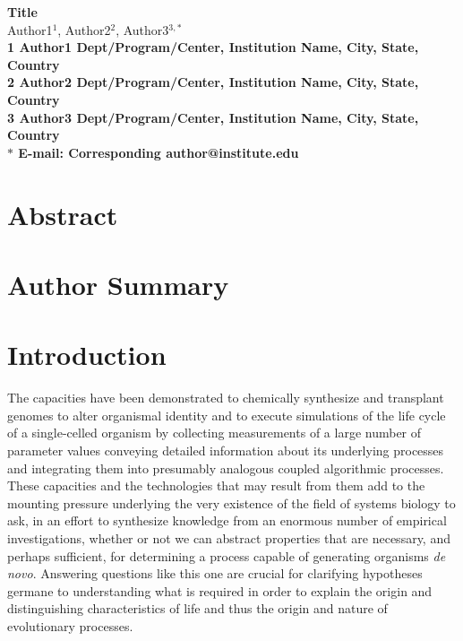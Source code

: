 \documentclass[10pt]{article}
\date{}
\begin{document}
\begin{flushleft}
{\Large
\textbf{Title}
}
\\
Author1$^{1}$, 
Author2$^{2}$, 
Author3$^{3,\ast}$
\\
\bf{1} Author1 Dept/Program/Center, Institution Name, City, State, Country
\\
\bf{2} Author2 Dept/Program/Center, Institution Name, City, State, Country
\\
\bf{3} Author3 Dept/Program/Center, Institution Name, City, State, Country
\\
$\ast$ E-mail: Corresponding author@institute.edu
\end{flushleft}

\listoftodos

\section*{Abstract}

\section*{Author Summary}

%

\section*{Introduction}
The capacities have been demonstrated to chemically synthesize and transplant genomes to alter organismal identity  and to execute simulations of the life cycle of a single-celled organism  by collecting measurements of a large number of parameter values conveying detailed information about its underlying processes and integrating them into presumably analogous coupled algorithmic processes. These capacities and the technologies that may result from them add to the mounting pressure underlying the very existence of the field of systems biology to ask, in an effort to synthesize knowledge from an enormous number of empirical investigations, whether or not we can abstract properties that are necessary, and perhaps sufficient, for determining a process capable of generating organisms \emph{de novo}. Answering questions like this one are crucial for clarifying hypotheses germane to understanding what is required in order to explain the origin and distinguishing characteristics of life and thus the origin and nature of evolutionary processes.
\end{document}
